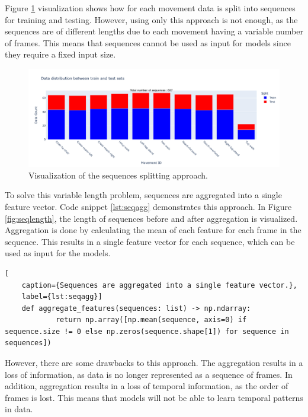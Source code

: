             Figure \ref{fig:seqsplit} visualization shows how for each movement data is split into sequences for training and testing. However, using only this approach is not enough, as the sequences are of different lengths due to each movement having a variable number of frames. This means that sequences cannot be used as input for models since they require a fixed input size. 
        
            \begin{figure}[H]
            \centering
            \includegraphics[width=1.0\textwidth]{../src/resources/plots/splits/seq.png}
            \caption{
                Visualization of the sequences splitting approach.
            }
            \label{fig:seqsplit}
        \end{figure}

        \newpage 

        To solve this variable length problem, sequences are aggregated into a single feature vector. Code snippet \ref{lst:seqagg} demonstrates this approach. In Figure \ref{fig:seqlength}, the length of sequences before and after aggregation is visualized. Aggregation is done by calculating the mean of each feature for each frame in the sequence. This results in a single feature vector for each sequence, which can be used as input for the models.

\begin{lstlisting}[
    caption={Sequences are aggregated into a single feature vector.}, 
    label={lst:seqagg}]                
    def aggregate_features(sequences: list) -> np.ndarray:
            return np.array([np.mean(sequence, axis=0) if sequence.size != 0 else np.zeros(sequence.shape[1]) for sequence in sequences])
\end{lstlisting}
        
However, there are some drawbacks to this approach. The aggregation results in a loss of information, as data is no longer represented as a sequence of frames. In addition, aggregation results in a loss of temporal information, as the order of frames is lost. This means that models will not be able to learn temporal patterns in data.

